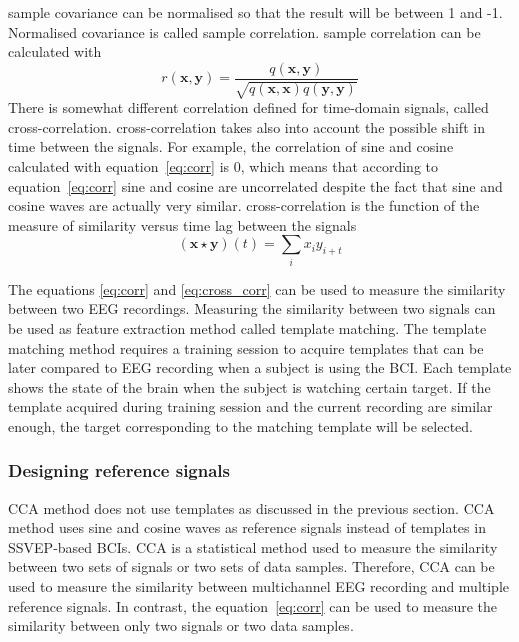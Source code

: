 \Gls{sample} \gls{covariance} can be normalised so that the result will be between 1 and -1. Normalised \gls{covariance} is called \gls{sample} \gls{correlation}. \Gls{sample} \gls{correlation} can be calculated with
\begin{equation}
	\label{eq:corr}
	r(\mathbf{x},\mathbf{y}) = \frac{q(\mathbf{x},\mathbf{y})}{\sqrt{q(\mathbf{x},\mathbf{x})q(\mathbf{y},\mathbf{y})}}
\end{equation}
There is somewhat different \gls{correlation} defined for time-domain signals, called \gls{cross-correlation}. \Gls{cross-correlation} takes also into account the possible shift in time between the signals. For example, the \gls{correlation} of sine and cosine calculated with equation~\ref{eq:corr} is 0, which means that according to equation~\ref{eq:corr} sine and cosine are uncorrelated despite the fact that sine and cosine waves are actually very similar. \Gls{cross-correlation} is the function of the measure of similarity versus time lag between the signals
\begin{equation}
	\label{eq:cross_corr}
	(\mathbf{x}\star \mathbf{y})(t)=\sum_{i}x_iy_{i+t}
\end{equation}

The equations \ref{eq:corr} and \ref{eq:cross_corr} can be used to measure the similarity between two \gls{EEG} recordings. Measuring the similarity between two signals can be used as \gls{feature extraction} method called \gls{template matching}. The \gls{template matching} method requires a training session to acquire templates that can be later compared to \gls{EEG} recording when a subject is using the \gls{BCI}. Each template shows the state of the brain when the subject is watching certain \gls{target}. If the template acquired during training session and the current recording are similar enough, the \gls{target} corresponding to the matching template will be selected.

\subsubsection{Designing reference signals}

\gls{CCA} method does not use templates as discussed in the previous section. \gls{CCA} method uses sine and cosine waves as \glspl{reference signal} instead of templates in \gls{SSVEP}-based \glspl{BCI}. \gls{CCA} is a statistical method used to measure the similarity between two sets of signals or two sets of data \glspl{sample}. Therefore, \gls{CCA} can be used to measure the similarity between multichannel \gls{EEG} recording and multiple \glspl{reference signal}. In contrast, the equation~\ref{eq:corr} can be used to measure the similarity between only two signals or two data \glspl{sample}.

